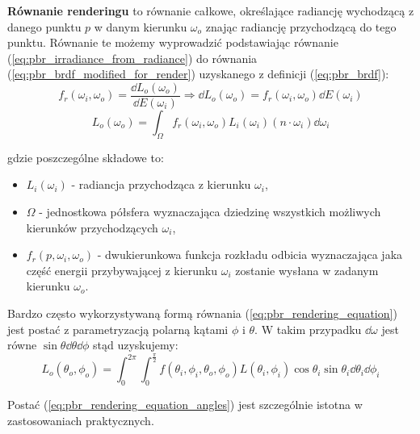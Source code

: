 \documentclass[../main.tex]{subfiles}
\begin{document}
\textbf{Równanie renderingu} to równanie całkowe, określające radiancję wychodzącą z danego punktu $p$ w danym kierunku $\omega_o$ znając radiancję przychodzącą do tego punktu. Równanie te możemy wyprowadzić podstawiając równanie (\ref{eq:pbr_irradiance_from_radiance}) do równania (\ref{eq:pbr_brdf_modified_for_render}) uzyskanego z definicji (\ref{eq:pbr_brdf}):
\begin{equation}
f_r(\omega_i, \omega_o) = \frac{
    \dd L_{o}(\omega_o)
}{
    \dd E(\omega_i)
} \Rightarrow 
\dd L_{o}(\omega_o) =  f_r(\omega_i, \omega_o) \dd E(\omega_i)
\label{eq:pbr_brdf_modified_for_render}
\end{equation}
\begin{equation}
  L_{o}(\omega_o) =
  \int_{\Omega} {
    f_r(\omega_i, \omega_o)
    L_i(\omega_i)
    (n \cdot \omega_i)
    \dd{\omega_i}
  }
\label{eq:pbr_rendering_equation}
\end{equation}

\noindent gdzie poszczególne składowe to:

\begin{itemize}

  \item $L_i(\omega_i)$ - radiancja przychodząca z kierunku $\omega_i$,

  \item $\Omega$ - jednostkowa półsfera wyznaczająca dziedzinę wszystkich
    możliwych kierunków przychodzących $\omega_i$,

  \item $f_{r}(p, \omega_i, \omega_o)$ - dwukierunkowa funkcja rozkładu odbicia wyznaczająca jaka część energii przybywającej z kierunku $\omega_i$ zostanie wysłana w zadanym kierunku $\omega_o$.

\end{itemize}

Bardzo często wykorzystywaną formą równania (\ref{eq:pbr_rendering_equation}) jest postać z parametryzacją polarną kątami $\phi$ i $\theta$. W takim przypadku $\dd \omega$ jest równe $\sin\theta \dd\theta \dd\phi$ \cite{wolfram_solidangle} stąd uzyskujemy:
\begin{equation}
L_{o}(\theta_o, \phi_o) = \int_{0}^{2\pi} \int_{0}^{\frac{\pi}{2}} {
	f(\theta_i, \phi_i, \theta_o, \phi_o)L(\theta_i, \phi_i) \cos\theta_i \sin\theta_i
} \dd\theta_i \dd\phi_i
\label{eq:pbr_rendering_equation_angles}
\end{equation}

\noindent Postać (\ref{eq:pbr_rendering_equation_angles}) jest szczególnie istotna w zastosowaniach praktycznych.
\end{document}
